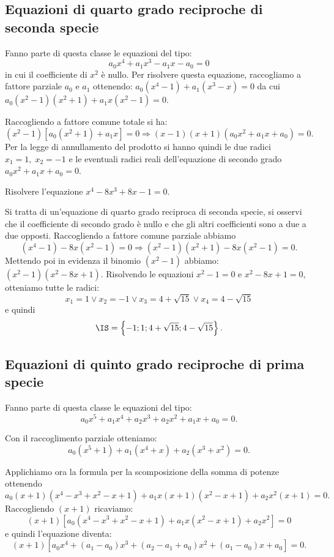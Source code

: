 \subsection{Equazioni di quarto grado reciproche di seconda specie}
Fanno parte di questa classe le equazioni del tipo: \[a_0x^4+a_1x^3-a_1x-a_0=0\] in cui il coefficiente di $x^2$ è nullo. Per risolvere questa equazione, raccogliamo a fattore parziale $a_0$ e $a_1$ ottenendo: $a_0\left(x^4-1\right)+a_1\left(x^3-x\right)=0$ da cui $a_0\left(x^2-1\right)\left(x^2+1\right)+a_1x\left(x^2-1\right)=0$.

Raccogliendo a fattore comune totale si ha:
\[\left(x^2-1\right)\left[a_0\left(x^2+1\right)+a_1x\right]=0\Rightarrow \left(x-1\right)\left(x+1\right)\left(a_0x^2+a_1x+a_0\right)=0.\]
Per la legge di annullamento del prodotto si hanno quindi le due radici $x_1=1,\;x_2=-1$ e le eventuali radici reali dell’equazione di secondo grado $a_0x^2+a_1x+a_0=0$.
\begin{exrig}
 \begin{esempio}
 Risolvere l'equazione $ x^4-8x^3+8x-1=0 $.

 Si tratta di un’equazione di quarto grado reciproca di seconda specie, si osservi che il coefficiente di secondo grado è nullo e che gli altri coefficienti sono a due a due opposti.
 Raccogliendo a fattore comune parziale abbiamo 
\[(x^4-1)-8x(x^2-1)=0\Rightarrow (x^2-1)(x^2+1)-8x(x^2-1)=0.\]
 Mettendo poi in evidenza il binomio $\left(x^2-1\right)$ abbiamo: $\left(x^2-1\right)\left(x^2-8x+1\right)$. Risolvendo le equazioni $x^2-1=0$ e $x^2-8x+1=0$, otteniamo tutte le radici: 
\[x_1=1\vee x_2=-1\vee x_3=4+\sqrt{15}\vee x_4=4-\sqrt{15}\] 
e quindi 
\[\IS=\left\{-1;1;4+\sqrt{15};4-\sqrt{15}\right\}.\]
 \end{esempio}
\end{exrig}
\ovalbox{\risolvii \ref{ese:5.47},\ref{ese:5.48},\ref{ese:5.49},\ref{ese:5.50},\ref{ese:5.51}}

\subsection{Equazioni di quinto grado reciproche di prima specie}
Fanno parte di questa classe le equazioni del tipo: \[a_0x^5+a_1x^4+a_2x^3+a_2x^2+a_1x+a_0=0.\]

Con il raccoglimento parziale otteniamo: 
\[a_0\left(x^5+1\right)+a_1\left(x^4+x\right)+a_2\left(x^3+x^2\right)=0.\]

Applichiamo ora la formula per la scomposizione della somma di potenze ottenendo
\[a_0(x+1)\left(x^4-x^3+x^2-x+1\right)+a_1x(x+1)\left(x^2-x+1\right)+a_2x^2(x+1)=0.\]
Raccogliendo $(x+1)$ ricaviamo: 
\[(x+1)\left[a_0\left(x^4-x^3+x^2-x+1\right)+a_1x\left(x^2-x+1\right)+a_2x^2\right]=0\]
e quindi l'equazione diventa:
\[(x+1)\left[a_0x^4+(a_1-a_0)x^3+(a_2-a_1+a_0)x^2+(a_1-a_0)x+a_0\right]=0.\]

